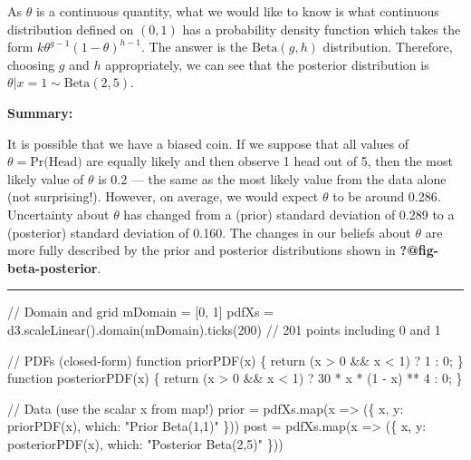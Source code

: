 \documentclass[
  letterpaper,
  DIV=11,
  numbers=noendperiod]{scrreprt}
\newenvironment{Shaded}{\begin{snugshade}}{\end{snugshade}}
\newcommand{\NormalTok}[1]{\textcolor[rgb]{0.00,0.23,0.31}{#1}}
\theoremstyle{definition}
\theoremstyle{plain}
\theoremstyle{definition}
\theoremstyle{remark}
\begin{document}
As \(\theta\) is a continuous quantity, what we would like to know is
what continuous distribution defined on \((0,1)\) has a probability
density function which takes the form \(k\theta^{g-1}(1-\theta)^{h-1}\).
The answer is the \(\textrm{Beta}(g,h)\) distribution. Therefore,
choosing \(g\) and \(h\) appropriately, we can see that the posterior
distribution is \(\theta|x=1\sim \textrm{Beta}(2,5)\).

\textbf{Summary:}

It is possible that we have a biased coin. If we suppose that all values
of \(\theta=\text{Pr(Head)}\) are equally likely and then observe 1 head
out of 5, then the most likely value of \(\theta\) is 0.2 --- the same
as the most likely value from the data alone (not surprising!). However,
on average, we would expect \(\theta\) to be around 0.286. Uncertainty
about \(\theta\) has changed from a (prior) standard deviation of 0.289
to a (posterior) standard deviation of 0.160. The changes in our beliefs
about \(\theta\) are more fully described by the prior and posterior
distributions shown in \textbf{?@fig-beta-posterior}.

\begin{center}\rule{0.5\linewidth}{0.5pt}\end{center}

\begin{Shaded}
\begin{Highlighting}[]

\NormalTok{// Domain and grid}
\NormalTok{mDomain = [0, 1]}
\NormalTok{pdfXs = d3.scaleLinear().domain(mDomain).ticks(200)  // 201 points including 0 and 1}

\NormalTok{// PDFs (closed{-}form)}
\NormalTok{function priorPDF(x)     \{ return (x \textgreater{} 0 \&\& x \textless{} 1) ? 1 : 0; \}}
\NormalTok{function posteriorPDF(x) \{ return (x \textgreater{} 0 \&\& x \textless{} 1) ? 30 * x * (1 {-} x) ** 4 : 0; \}}

\NormalTok{// Data (use the scalar x from map!)}
\NormalTok{prior = pdfXs.map(x =\textgreater{} (\{ x, y: priorPDF(x), which: "Prior  Beta(1,1)" \}))}
\NormalTok{post  = pdfXs.map(x =\textgreater{} (\{ x, y: posteriorPDF(x), which: "Posterior  Beta(2,5)" \}))}
\end{Highlighting}
\end{Shaded}
\end{document}
